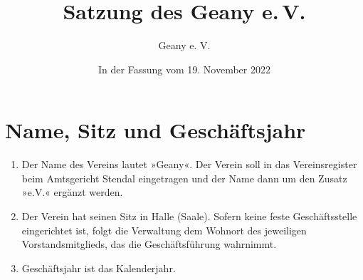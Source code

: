 \documentclass[fontsize=12pt,paper=a4,pagesize,headings=small]{scrartcl}
\title{Satzung des Geany e.\,V.}
\author{Geany e. V.}
\date{In der Fassung vom 19. November 2022}
\begin{document}
\maketitle{}

\section{Name, Sitz und Geschäftsjahr}
\begin{enumerate}
    \item Der Name des Vereins lautet »Geany«. Der Verein soll in das
    Vereinsregister beim Amtsgericht Stendal eingetragen und der Name
    dann um den Zusatz »e.V.« ergänzt werden.

    \item Der Verein hat seinen Sitz in Halle (Saale). Sofern keine
    feste Geschäftsstelle eingerichtet ist, folgt die Verwaltung dem
    Wohnort des jeweiligen Vorstandsmitglieds, das die Geschäftsführung
    wahrnimmt.

    \item Geschäftsjahr ist das Kalenderjahr.
\end{enumerate}
\end{document}
